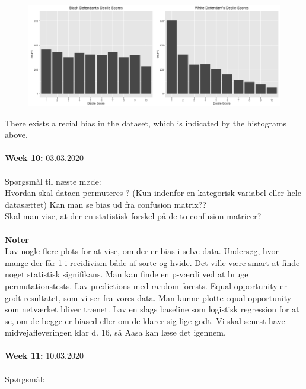 \documentclass[11pt, fleqn]{article}
\begin{document}
	\begin{figure}[H]
		\centering
		\includegraphics[width=0.7\linewidth]{billeder/black_white}
	\end{figure}
	\noindent
	There exists a recial bias in the dataset, which is indicated by the histograms above. 
	\\\\
	\textbf{Week 10:}  03.03.2020 \\\\
	\noindent
	Spørgsmål til næste møde: \\
	Hvordan skal dataen permuteres ? (Kun indenfor en kategorisk variabel eller hele datasættet) \newline 
	Kan man se bias ud fra confusion matrix?? \\ 
	Skal man vise, at der en statistisk forskel på de to confusion matricer? \\ \\
	\textbf{Noter} \\ 
	Lav nogle flere plots for at vise, om der er bias i selve data. Undersøg, hvor mange der får 1 i recidivism både af sorte og hvide.
	\newline
	Det ville være smart at finde noget statistisk signifikans. Man kan finde en p-værdi ved at bruge permutationstests.
	\newline
	Lav predictions med random forests.
	\newline
	Equal opportunity er godt resultatet, som vi ser fra vores data. Man kunne plotte equal opportunity som netværket bliver trænet.
	\newline
	Lav en slags baseline som logistisk regression for at se, om de begge er biased eller om de klarer sig lige godt.
	\newline
	Vi skal senest have midvejafleveringen klar d. 16, så Aasa kan læse det igennem.	
	\\\\	
	\textbf{Week 11:}  10.03.2020 \\\\
	\noindent
	Spørgsmål:
\end{document}
